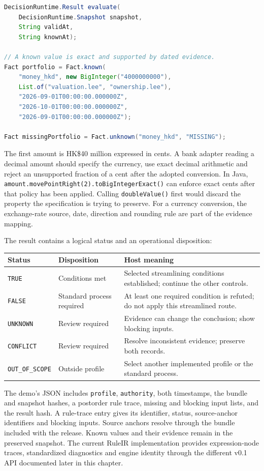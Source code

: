 \begin{lstlisting}[language=Java,caption={The library API and one dated monetary input.}]
DecisionRuntime.Result evaluate(
    DecisionRuntime.Snapshot snapshot,
    String validAt,
    String knownAt);

// A known value is exact and supported by dated evidence.
Fact portfolio = Fact.known(
    "money_hkd", new BigInteger("4000000000"),
    List.of("valuation.lee", "ownership.lee"),
    "2026-09-01T00:00:00.000000Z",
    "2026-10-01T00:00:00.000000Z",
    "2026-09-01T00:00:00.000000Z");

Fact missingPortfolio = Fact.unknown("money_hkd", "MISSING");
\end{lstlisting}
The first amount is HK\$40 million expressed in cents. A bank adapter reading a
decimal amount should specify the currency, use exact decimal arithmetic and
reject an unsupported fraction of a cent after the adopted conversion. In Java,
\texttt{amount.movePointRight(2).toBigIntegerExact()} can enforce exact cents
after that policy has been applied. Calling \texttt{doubleValue()} first would
discard the property the specification is trying to preserve. For a currency
conversion, the exchange-rate source, date, direction and rounding rule are part
of the evidence mapping.


The result contains a logical status and an operational disposition:
\begin{center}\small
\begin{tabularx}{\textwidth}{P{0.18\textwidth}P{0.34\textwidth}Y}
\toprule Status & Disposition & Host meaning \\\midrule
\texttt{TRUE} & Conditions met & Selected streamlining conditions established; continue the other controls.\\
\texttt{FALSE} & Standard process required & At least one required condition is refuted; do not apply this streamlined route.\\
\texttt{UNKNOWN} & Review required & Evidence can change the conclusion; show blocking inputs.\\
\texttt{CONFLICT} & Review required & Resolve inconsistent evidence; preserve both records.\\
\texttt{OUT\_OF\_SCOPE} & Outside profile & Select another implemented profile or the standard process.\\
\bottomrule
\end{tabularx}
\end{center}
The demo's JSON includes \texttt{profile}, \texttt{authority}, both timestamps,
the bundle and snapshot hashes, a postorder rule trace, missing and blocking
input lists, and the result hash. A rule-trace entry gives its identifier,
status, source-anchor identifiers and blocking inputs. Source anchors resolve
through the bundle included with the release. Known values and their evidence
remain in the preserved snapshot. The current RuleIR implementation provides expression-node traces,
standardized diagnostics and engine identity through the different v0.1 API
documented later in this chapter.

